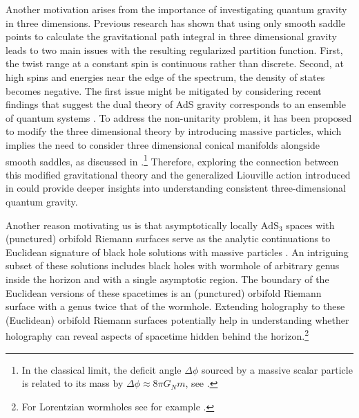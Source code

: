\documentclass[a4paper,11pt]{article}
\begin{document}
Another motivation arises from the importance of investigating quantum gravity in three dimensions. Previous research \cite{maloney2010quantum,keller2015poincare} has shown that using only smooth saddle points to calculate the gravitational path integral in three dimensional gravity leads to two main issues with the resulting regularized partition function. First, the twist range at a constant spin is continuous rather than discrete. Second, at high spins and energies near the edge of the spectrum, the density of states becomes negative. The first issue might be mitigated by considering recent findings that suggest the dual theory of AdS gravity corresponds to an ensemble of quantum systems \cite{saad2019jt,stanford2019jt,jafferis20243d}. To address the non-unitarity problem, it has been proposed to modify the three dimensional theory by introducing massive particles, which implies the need to consider three dimensional conical manifolds alongside smooth saddles, as discussed in \cite{benjamin2020pure}.\footnote{In the classical limit, the deficit angle $\Delta\phi$ sourced by a massive scalar
	particle is related to its mass by $\Delta\phi\approx 8\pi G_{N}m$, see \cite{deser1984three}.} Therefore, exploring the connection between this modified gravitational theory and the generalized Liouville action introduced in \cite{Taghavi2024classical} could provide deeper insights into understanding consistent three-dimensional quantum gravity.

Another reason motivating us is that asymptotically locally $\text{AdS}_3$ spaces with (punctured) orbifold Riemann surfaces serve as the analytic continuations to Euclidean signature of black hole solutions with massive particles \cite{Krasnov_2001,krasnov2002lambda}. An intriguing subset of these solutions includes black holes with wormhole of arbitrary genus inside the horizon and with a single asymptotic region. The boundary of the Euclidean versions of these spacetimes is an (punctured) orbifold Riemann surface with a genus twice that of the wormhole. Extending holography to these (Euclidean) orbifold Riemann surfaces potentially help in understanding whether holography can reveal aspects of spacetime hidden behind the horizon.\footnote{For Lorentzian wormholes see for example \cite{brill2000black,maldacena2004wormholes,skenderis2011holography,balasubramanian2014multiboundary}. }
\end{document}
